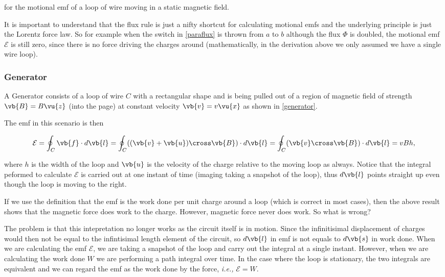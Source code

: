 \documentclass[english,a4paper,12pt]{report}
\begin{document}
for the motional emf of a loop of wire moving in a static magnetic field.

It is important to understand that the flux rule is just a nifty shortcut for calculating motional emfs and the underlying principle is just the Lorentz force law. So for example when the switch in \cref{paraflux} is thrown from \(a\) to \(b\) although the flux \(\Phi \) is doubled, the motional emf \(\mathcal{E}\) is still zero, since there is no force driving the charges around (mathematically, in the derivation above we only assumed we have a single wire loop).


\subsubsection{Generator}

A Generator consists of a loop of wire \(C\) with a rectangular shape and is being pulled out of a region of magnetic field of strength \(\vb{B} = B \vu{z}  \) (into the page) at constant velocity \(\vb{v} = v \vu{x} \)  as shown in \cref{generator}.


The emf in this scenario is then 

\begin{equation}
    \mathcal{E} = \oint_{C} \vb{f}  \cdot d \vb{l} = \oint_{C} ((\vb{v} + \vb{u}) \cross \vb{B} ) \cdot  d\vb{l}  = \oint_{C}(\vb{v} \cross \vb{B} )\cdot d \vb{l} =  vBh ,
\end{equation}

where \(h\) is the width of the loop and \(\vb{u}\) is the velocity of the charge relative to the moving loop as always. Notice that the integral peformed to calculate \(\mathcal{E}\) is carried out at one instant of time (imaging taking a snapshot of the loop), thus \(d \vb{l} \) points straight up even though the loop is moving to the right.  

If we use the definition that the emf is the work done per unit charge around a loop (which is correct in most cases), then the above result shows that the magnetic force does work to the charge. However, magnetic force never does work. So what is wrong?

The problem is that this intepretation no longer works as the circuit itself is in motion. Since the infinitisimal displacement of charges would then not be equal to the infintisimal length element of the circuit, so \(d \vb{l} \) in emf is not equals to \(d \vb{s} \) in work done. When we are calculating the emf \(\mathcal{E}\), we are taking a snapshot of the loop and carry out the integral at a single instant. However, when we are calculating the work done \(W\) we are performing a path integral over time. In the case where the loop is stationary, the two integrals are equivalent and we can regard the emf as the work done by the force, \textit{i.e.,} \(\mathcal{E}= W\). 
\end{document}
